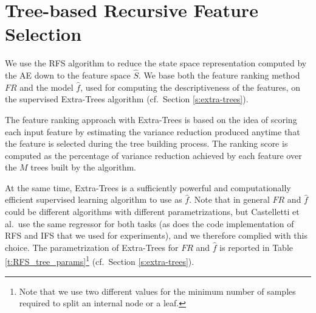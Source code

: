 \section{Tree-based Recursive Feature Selection}
We use the RFS algorithm to reduce the state space representation computed by 
the AE down to the feature space $\hat{S}$.
We base both the feature ranking method $FR$ and the model $\hat{f}$, used for
computing the descriptiveness of the features, on the supervised Extra-Trees 
algorithm (cf.\ Section \ref{s:extra-trees}).

The feature ranking approach with Extra-Trees is based on the idea of scoring
each input feature by estimating the variance reduction produced anytime that 
the feature is selected during the tree building process. The ranking score is
computed as the percentage of variance reduction achieved by each feature over 
the $M$ trees built by the algorithm.

At the same time, Extra-Trees is a sufficiently powerful and computationally 
efficient supervised learning algorithm to use as $\hat{f}$.
Note that in general $FR$ and $\hat{f}$ could be different algorithms with 
different parametrizations, but Castelletti et al.\ use the same regressor for 
both tasks (as does the code implementation of RFS and IFS that we used for 
experiments), and we therefore complied with this choice.
The parametrization of Extra-Trees for $FR$ and $\hat{f}$ is reported in Table
\ref{t:RFS_tree_params}\footnote{Note that we use two different values for the 
minimum number of samples required to split an internal node or a leaf.} 
(cf.\ Section \ref{s:extra-trees}).

